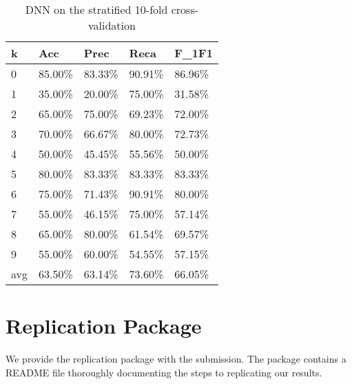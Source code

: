 \documentclass{article}
\begin{document}
\begin{table}[h]
	\centering
	\caption{DNN on the stratified 10-fold cross-validation}
	\begin{tabular}{|l|l|l|l|l|}
	\hline
	\textbf{k} & \textbf{Acc} & \textbf{Prec} & \textbf{Reca} & \textbf{F\_1F1} \\ \hline
	0          & 85.00\%      & 83.33\%       & 90.91\%       & 86.96\%         \\ \hline
	1          & 35.00\%      & 20.00\%       & 75.00\%       & 31.58\%         \\ \hline
	2          & 65.00\%      & 75.00\%       & 69.23\%       & 72.00\%         \\ \hline
	3          & 70.00\%      & 66.67\%       & 80.00\%       & 72.73\%         \\ \hline
	4          & 50.00\%      & 45.45\%       & 55.56\%       & 50.00\%         \\ \hline
	5          & 80.00\%      & 83.33\%       & 83.33\%       & 83.33\%         \\ \hline
	6          & 75.00\%      & 71.43\%       & 90.91\%       & 80.00\%         \\ \hline
	7          & 55.00\%      & 46.15\%       & 75.00\%       & 57.14\%         \\ \hline
	8          & 65.00\%      & 80.00\%       & 61.54\%       & 69.57\%         \\ \hline
	9          & 55.00\%      & 60.00\%       & 54.55\%       & 57.15\%         \\ \hline
	avg        & 63.50\%      & 63.14\%       & 73.60\%       & 66.05\%         \\ \hline
	\end{tabular}
\end{table}


\section*{Replication Package}
We provide the replication package with the submission. The package contains a README file thoroughly documenting the steps to replicating our results. 




\end{document}
